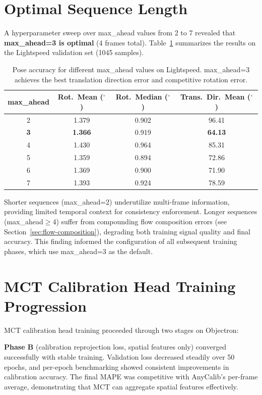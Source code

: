 \section{Optimal Sequence Length}\label{sec:app-sequence-length}

A hyperparameter sweep over max\_ahead values from 2 to 7 revealed that \textbf{max\_ahead=3 is optimal} (4 frames total). Table~\ref{tab:max-ahead-sweep} summarizes the results on the Lightspeed validation set (1045 samples).

\begin{table}[ht]
\centering
\caption{Pose accuracy for different max\_ahead values on Lightspeed. max\_ahead=3 achieves the best translation direction error and competitive rotation error.}
\label{tab:max-ahead-sweep}
\begin{tabular}{cccc}
\toprule
max\_ahead & Rot.\ Mean ($^\circ$) & Rot.\ Median ($^\circ$) & Trans.\ Dir.\ Mean ($^\circ$) \\
\midrule
2 & 1.379 & 0.902 & 96.41 \\
\textbf{3} & \textbf{1.366} & 0.919 & \textbf{64.13} \\
4 & 1.430 & 0.964 & 85.31 \\
5 & 1.359 & 0.894 & 72.86 \\
6 & 1.369 & 0.900 & 71.90 \\
7 & 1.393 & 0.924 & 78.59 \\
\bottomrule
\end{tabular}
\end{table}

Shorter sequences (max\_ahead=2) underutilize multi-frame information, providing limited temporal context for consistency enforcement. Longer sequences (max\_ahead$\geq$4) suffer from compounding flow composition errors (see Section~\ref{sec:flow-composition}), degrading both training signal quality and final accuracy. This finding informed the configuration of all subsequent training phases, which use max\_ahead=3 as the default.

\section{MCT Calibration Head Training Progression}\label{sec:app-fat-progression}

MCT calibration head training proceeded through two stages on Objectron:

\textbf{Phase B} (calibration reprojection loss, spatial features only) converged successfully with stable training. Validation loss decreased steadily over 50 epochs, and per-epoch benchmarking showed consistent improvements in calibration accuracy. The final MAPE was competitive with AnyCalib's per-frame average, demonstrating that MCT can aggregate spatial features effectively.

